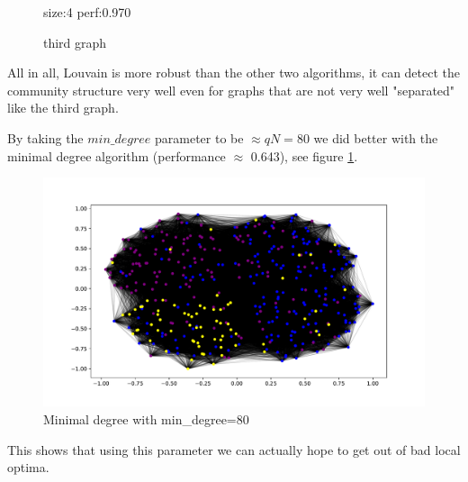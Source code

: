 \documentclass{article}
\begin{document}
\begin{figure}[!ht]
\begin{minipage}{.33\textwidth}
  \caption*{size:4 perf:0.970}
\end{minipage}
\caption{third graph}
\end{figure}
\newpage
All in all, Louvain is more robust than the other two algorithms, it can detect
the community structure very well even for graphs that are not very well
"separated" like the third graph.

By taking the $min\_degree$ parameter to be $\approx qN = 80$ we did better
with the minimal degree algorithm (performance $\approx$ 0.643), see figure
\ref{fig:9}.

\begin{figure}[!ht]
    \centering
    \includegraphics[width=\linewidth]{plots/ex3minimalDegree.pdf}
    \caption{Minimal degree with min\_degree=80}
    \label{fig:9}
\end{figure}
This shows that using this parameter we can actually hope to get out of bad
local optima.
\end{document}
